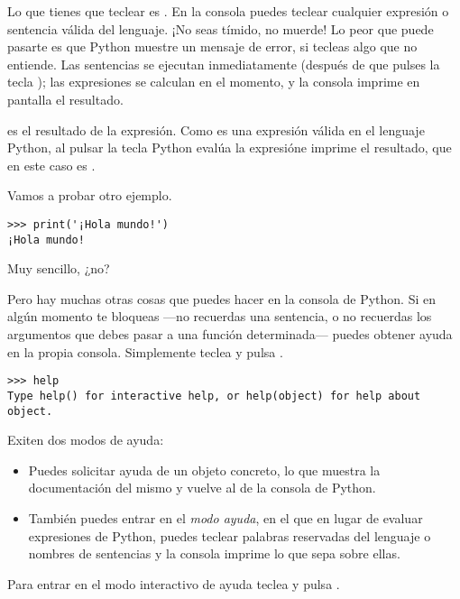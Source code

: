 Lo que tienes que teclear es .  En la consola puedes teclear cualquier expresión o sentencia válida del lenguaje. ¡No seas tímido, no muerde! Lo peor que puede pasarte es que Python muestre un mensaje de error, si tecleas algo que no entiende. Las sentencias se ejecutan inmediatamente (después de que pulses la tecla ); las expresiones se calculan en el momento, y la consola imprime en pantalla el resultado.

 es el resultado de la expresión. Como  es una expresión válida en el lenguaje Python, al pulsar la tecla  Python evalúa la expresióne imprime el resultado, que en este caso es .

Vamos a probar otro ejemplo.

\begin{listing}
\begin{verbatim}
>>> print('¡Hola mundo!')
¡Hola mundo!
\end{verbatim}
\end{listing}

Muy sencillo, ¿no?

Pero hay muchas otras cosas que puedes hacer en la consola de Python. Si en algún momento te bloqueas ---no recuerdas una sentencia, o no recuerdas los argumentos que debes pasar a una función determinada--- puedes obtener ayuda en la propia consola. Simplemente teclea  y pulsa .

\begin{listing}
\begin{verbatim}
>>> help
Type help() for interactive help, or help(object) for help about object.
\end{verbatim}
\end{listing}

Exiten dos modos de ayuda:
\begin{itemize}
\item Puedes solicitar ayuda de un objeto concreto, lo que muestra la documentación del mismo y vuelve al  de la consola de Python. 
\item También puedes entrar en el \emph{modo ayuda}, en el que en lugar de evaluar expresiones de Python, puedes teclear palabras reservadas del lenguaje o nombres de sentencias y la consola imprime lo que sepa sobre ellas.
\end{itemize}

Para entrar en el modo interactivo de ayuda teclea  y pulsa .


